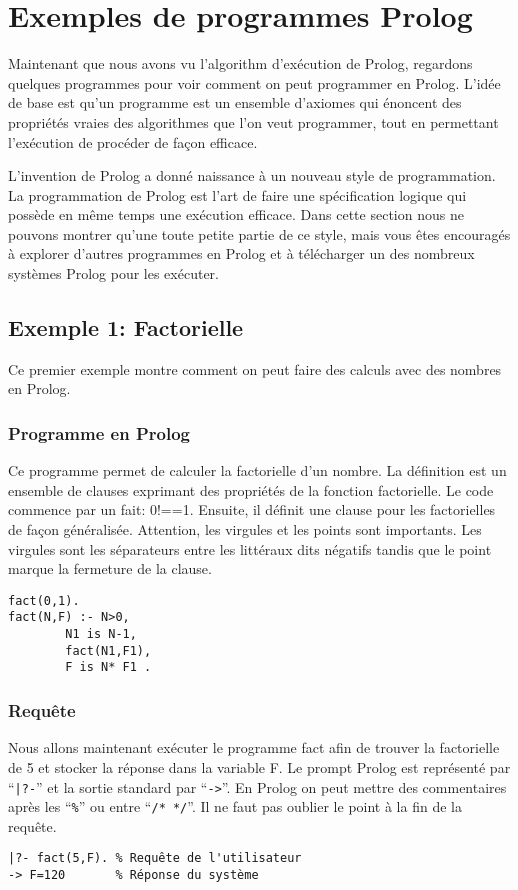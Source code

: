 \section{Exemples de programmes Prolog}

Maintenant que nous avons vu l'algorithm d'exécution de Prolog,
regardons quelques programmes pour voir comment on peut programmer en Prolog.
L'idée de base est qu'un programme est un ensemble d'axiomes qui énoncent des propriétés vraies
des algorithmes que l'on veut programmer, tout en permettant l'exécution de procéder de façon efficace.

L'invention de Prolog a donné naissance à un nouveau style de programmation.
La programmation de Prolog est l'art de faire une spécification logique qui possède en même temps une exécution efficace.
Dans cette section nous ne pouvons montrer qu'une toute petite partie de ce style,
mais vous êtes encouragés à explorer d'autres programmes en Prolog et à télécharger
un des nombreux systèmes Prolog pour les exécuter.

\subsection{Exemple 1: Factorielle}

Ce premier exemple montre comment on peut faire des calculs avec des nombres en Prolog.

\subsubsection{Programme en Prolog}

Ce programme permet de calculer la factorielle d'un nombre.
La définition est un ensemble de clauses exprimant des propriétés de la fonction factorielle.
Le code commence par un fait: 0!==1.
Ensuite, il définit une clause pour les factorielles de façon généralisée.
Attention, les virgules et les points sont importants.
Les virgules sont les séparateurs entre les littéraux dits négatifs tandis que le point marque la fermeture de la clause.
\begin{verbatim}
fact(0,1).
fact(N,F) :- N>0, 
        N1 is N-1,
        fact(N1,F1), 
        F is N* F1 .
\end{verbatim}

\subsubsection{Requête}

Nous allons maintenant exécuter le programme fact afin de trouver la factorielle de 5 et stocker la réponse dans la variable F.
Le prompt Prolog est représenté par ``\verb+|?-+'' et la sortie standard par ``\verb+->+''.
En Prolog on peut mettre des commentaires après les ``\verb+%+'' ou entre ``\verb+/* */+''.
Il ne faut pas oublier le point à la fin de la requête.
\begin{verbatim} 
|?- fact(5,F). % Requête de l'utilisateur
-> F=120       % Réponse du système
\end{verbatim}

